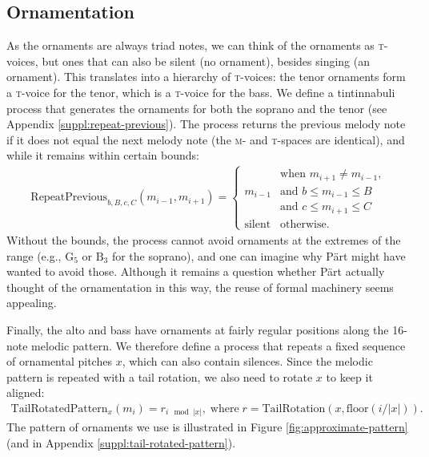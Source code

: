 \documentclass{interact}
\newcommand{\spn}[2]{\text{#1}_{#2}}
\newcommand{\MM}{\textsc{m}}
\newcommand{\TT}{\textsc{t}}
\begin{document}
\subsection{Ornamentation}

As the ornaments are always triad notes, we can think of the ornaments as \TT-voices, but ones that can also be silent (no ornament), besides singing (an ornament).
This translates into a hierarchy of \TT-voices: the tenor ornaments form a \TT-voice for the tenor, which is a \TT-voice for the bass.
We define a tintinnabuli process that generates the ornaments for both the soprano and the tenor (see Appendix \ref{suppl:repeat-previous}).
The process returns the previous melody note if it does not equal the next melody note (the \MM- and \TT-spaces are identical), and while it remains within certain bounds:
\begin{align}
    \text{RepeatPrevious}_{b,B,c,C}(m_{i-1}, m_{i+1}) =
        \begin{cases}
                       & \text{when $m_{i+1} \neq m_{i-1}$,}\\    
        m_{i-1}        & \text{and $b \le m_{i-1} \le B$}\\
                       & \text{and $c \le m_{i+1} \le C$}\\    
        \text{silent}  & \text{otherwise}.
        \end{cases}
\end{align}
Without the bounds, the process cannot avoid ornaments at the extremes of the range (e.g., $\spn{G}{5}$ or $\spn{B}{3}$ for the soprano), and one can imagine why Pärt might have wanted to avoid those.
Although it remains a question whether Pärt actually thought of the ornamentation in this way, the reuse of formal machinery seems appealing.


Finally, the alto and bass have ornaments at fairly regular positions along the 16-note melodic pattern.
We therefore define a process that repeats a fixed sequence of ornamental pitches $x$, which can also contain silences.
Since the melodic pattern is repeated with a tail rotation, we also need to rotate $x$ to keep it aligned:
\begin{align}
    \text{TailRotatedPattern}_x(m_i) = r_{i \mod |x|}, 
    \; \text{where} \; r = \text{TailRotation}(x, \text{floor}(i / |x|)).
\end{align}
The pattern of ornaments we use is illustrated in Figure \ref{fig:approximate-pattern} (and in Appendix \ref{suppl:tail-rotated-pattern}).
\end{document}
